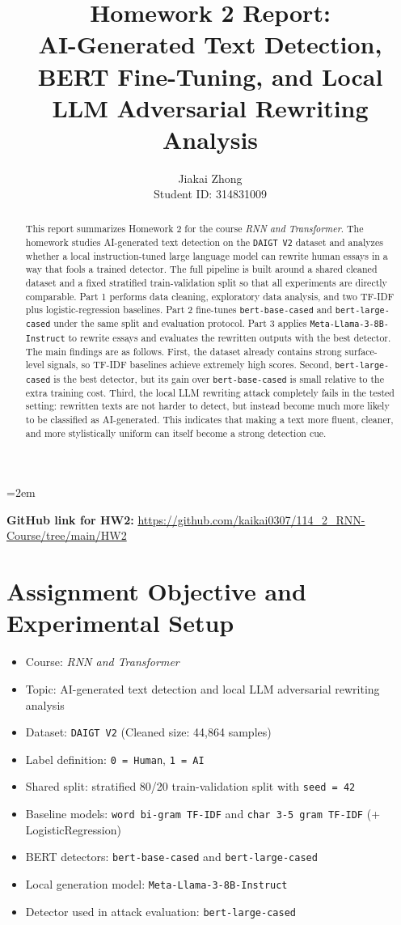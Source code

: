 \documentclass[10pt,journal,onecolumn,draftclsnofoot]{IEEEtran}
\title{Homework 2 Report:\\ AI-Generated Text Detection, BERT Fine-Tuning, and Local LLM Adversarial Rewriting Analysis}
\author{Jiakai Zhong\\Student ID: 314831009}
\date{}
\begin{document}
\maketitle
\emergencystretch=2em

\begin{abstract}
This report summarizes Homework 2 for the course \textit{RNN and Transformer}. The homework studies AI-generated text detection on the \texttt{DAIGT V2} dataset and analyzes whether a local instruction-tuned large language model can rewrite human essays in a way that fools a trained detector. The full pipeline is built around a shared cleaned dataset and a fixed stratified train-validation split so that all experiments are directly comparable. Part 1 performs data cleaning, exploratory data analysis, and two TF-IDF plus logistic-regression baselines. Part 2 fine-tunes \texttt{bert-base-cased} and \texttt{bert-large-cased} under the same split and evaluation protocol. Part 3 applies \texttt{Meta-Llama-3-8B-Instruct} to rewrite essays and evaluates the rewritten outputs with the best detector. The main findings are as follows. First, the dataset already contains strong surface-level signals, so TF-IDF baselines achieve extremely high scores. Second, \texttt{bert-large-cased} is the best detector, but its gain over \texttt{bert-base-cased} is small relative to the extra training cost. Third, the local LLM rewriting attack completely fails in the tested setting: rewritten texts are not harder to detect, but instead become much more likely to be classified as AI-generated. This indicates that making a text more fluent, cleaner, and more stylistically uniform can itself become a strong detection cue.
\end{abstract}

\noindent\textbf{GitHub link for HW2:} \url{https://github.com/kaikai0307/114_2_RNN-Course/tree/main/HW2}

\section{Assignment Objective and Experimental Setup}

\begin{itemize}
\item Course: \textit{RNN and Transformer}
\item Topic: AI-generated text detection and local LLM adversarial rewriting analysis
\item Dataset: \texttt{DAIGT V2} (Cleaned size: 44,864 samples)
\item Label definition: \texttt{0 = Human}, \texttt{1 = AI}
\item Shared split: stratified 80/20 train-validation split with \texttt{seed = 42}
\item Baseline models: \texttt{word bi-gram TF-IDF} and \texttt{char 3-5 gram TF-IDF} (+ LogisticRegression)
\item BERT detectors: \texttt{bert-base-cased} and \texttt{bert-large-cased}
\item Local generation model: \texttt{Meta-Llama-3-8B-Instruct}
\item Detector used in attack evaluation: \texttt{bert-large-cased}
\end{itemize}
\end{document}
